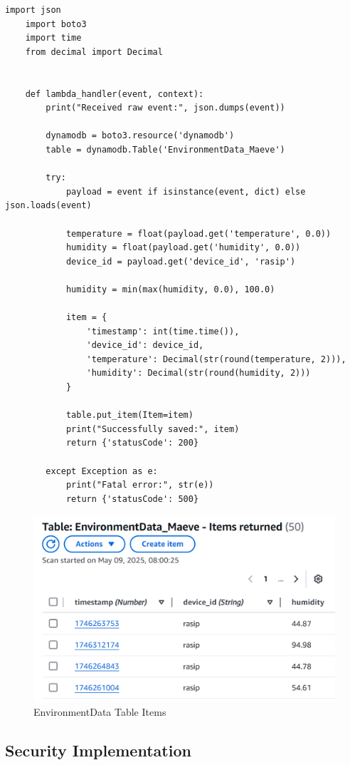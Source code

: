 \documentclass[12pt,a4paper]{article}
\begin{document}
\vspace{\baselineskip}
\begin{lstlisting}[style=classiclambda, caption={Code for Data Processing}]
    import json
    import boto3
    import time
    from decimal import Decimal
    
    
    def lambda_handler(event, context):
        print("Received raw event:", json.dumps(event))
    
        dynamodb = boto3.resource('dynamodb')
        table = dynamodb.Table('EnvironmentData_Maeve')
    
        try:
            payload = event if isinstance(event, dict) else json.loads(event)
    
            temperature = float(payload.get('temperature', 0.0))
            humidity = float(payload.get('humidity', 0.0))
            device_id = payload.get('device_id', 'rasip')
    
            humidity = min(max(humidity, 0.0), 100.0)  
    
            item = {
                'timestamp': int(time.time()),
                'device_id': device_id,
                'temperature': Decimal(str(round(temperature, 2))),
                'humidity': Decimal(str(round(humidity, 2)))
            }
    
            table.put_item(Item=item)
            print("Successfully saved:", item)
            return {'statusCode': 200}
    
        except Exception as e:
            print("Fatal error:", str(e))
            return {'statusCode': 500}
    \end{lstlisting}

    \begin{figure}[h!]
      \centering
      \includegraphics[width=0.58\linewidth]{figures/db.png}
      \caption{EnvironmentData Table Items}
  \end{figure}
  
    
\subsection{Security Implementation}
\end{document}
